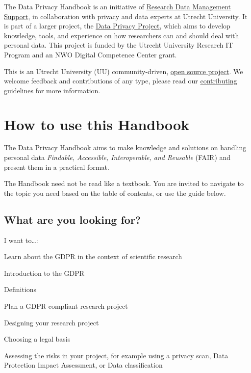 \documentclass[
]{book}
\begin{document}
The Data Privacy Handbook is an initiative of
\href{https://www.uu.nl/en/research/research-data-management}{Research Data Management Support},
in collaboration with privacy and data experts at
Utrecht University. It is part of a larger project, the
\href{https://utrechtuniversity.github.io/dataprivacyproject}{Data Privacy Project},
which aims to develop knowledge, tools, and experience
on how researchers can and should deal with personal data. This project is
funded by the Utrecht University Research IT Program and an NWO Digital
Competence Center grant.

This is an Utrecht University (UU) community-driven,
\href{https://github.com/UtrechtUniversity/dataprivacyhandbook}{open source project}.
We welcome feedback and contributions of any type, please read our
\href{https://github.com/UtrechtUniversity/dataprivacyhandbook/blob/main/CONTRIBUTING.md}{contributing guidelines}
for more information.

\hypertarget{how-to-use-this-handbook}{%
\section{How to use this Handbook}\label{how-to-use-this-handbook}}

The Data Privacy Handbook aims to make knowledge and solutions on handling personal
data \emph{Findable, Accessible, Interoperable, and Reusable} (FAIR) and present them in
a practical format.

The Handbook need not be read like a textbook. You are invited to navigate to the
topic you need based on the table of contents, or use the guide below.

\hypertarget{what-are-you-looking-for}{%
\subsection{What are you looking for?}\label{what-are-you-looking-for}}

I want to\ldots:

Learn about the GDPR in the context of scientific research

Introduction to the GDPR

Definitions

Plan a GDPR-compliant research project

Designing your research project

Choosing a legal basis

Assessing the risks in your project,
for example using a privacy scan,
Data Protection Impact Assessment, or
Data classification
\end{document}
